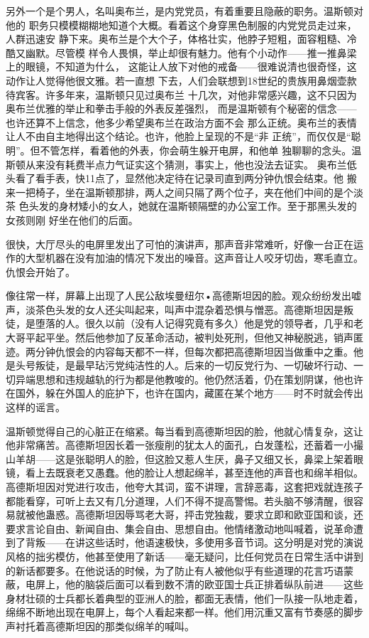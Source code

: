 另外一个是个男人，名叫奥布兰，是内党党员，有着重要且隐蔽的职务。温斯顿对他的
职务只模模糊糊地知道个大概。看着这个身穿黑色制服的内党党员走过来，人群迅速安
静下来。奥布兰是个大个子，体格壮实，他脖子短粗，面容粗糙、冷酷又幽默。尽管模
样令人畏惧，举止却很有魅力。他有个小动作——推一推鼻梁上的眼镜，不知道为什么，
这能让人放下对他的戒备——很难说清也很奇怪，这动作让人觉得他很文雅。若一直想
下去，人们会联想到18世纪的贵族用鼻烟壶款待宾客。许多年来，温斯顿只见过奥布兰
十几次，对他非常感兴趣，这不只因为奥布兰优雅的举止和拳击手般的外表反差强烈，
而是温斯顿有个秘密的信念——也许还算不上信念，他多少希望奥布兰在政治方面不会
那么正统。奥布兰的表情让人不由自主地得出这个结论。也许，他脸上呈现的不是``非
正统''，而仅仅是``聪明''。但不管怎样，看着他的外表，你会萌生躲开电屏，和他单
独聊聊的念头。温斯顿从来没有耗费半点力气证实这个猜测，事实上，他也没法去证实。
奥布兰低头看了看手表，快11点了，显然他决定待在记录司直到两分钟仇恨会结束。他
搬来一把椅子，坐在温斯顿那排，两人之间只隔了两个位子，夹在他们中间的是个淡茶
色头发的身材矮小的女人，她就在温斯顿隔壁的办公室工作。至于那黑头发的女孩则刚
好坐在他们的后面。

很快，大厅尽头的电屏里发出了可怕的演讲声，那声音非常难听，好像一台正在运作的大型机器在没有加油的情况下发出的噪音。这声音让人咬牙切齿，寒毛直立。仇恨会开始了。

像往常一样，屏幕上出现了人民公敌埃曼纽尔•高德斯坦因的脸。观众纷纷发出嘘声，淡茶色头发的女人还尖叫起来，叫声中混杂着恐惧与憎恶。高德斯坦因是叛徒，是堕落的人。很久以前（没有人记得究竟有多久）他是党的领导者，几乎和老大哥平起平坐。然后他参加了反革命活动，被判处死刑，但他又神秘脱逃，销声匿迹。两分钟仇恨会的内容每天都不一样，但每次都把高德斯坦因当做重中之重。他是头号叛徒，是最早玷污党纯洁性的人。后来的一切反党行为、一切破坏行动、一切异端思想和违规越轨的行为都是他教唆的。他仍然活着，仍在策划阴谋，他也许在国外，躲在外国人的庇护下，也许在国内，藏匿在某个地方——时不时就会传出这样的谣言。

温斯顿觉得自己的心脏正在缩紧。每当看到高德斯坦因的脸，他就心情复杂，这让他非常痛苦。高德斯坦因长着一张瘦削的犹太人的面孔，白发蓬松，还蓄着一小撮山羊胡——这是张聪明人的脸，但这脸又惹人生厌，鼻子又细又长，鼻梁上架着眼镜，看上去既衰老又愚蠢。他的脸让人想起绵羊，甚至连他的声音也和绵羊相似。高德斯坦因对党进行攻击，他夸大其词，蛮不讲理，言辞恶毒，这套把戏就连孩子都能看穿，可听上去又有几分道理，人们不得不提高警惕。若头脑不够清醒，很容易就被他蛊惑。高德斯坦因辱骂老大哥，抨击党独裁，要求立即和欧亚国和谈，还要求言论自由、新闻自由、集会自由、思想自由。他情绪激动地叫喊着，说革命遭到了背叛——在讲这些话时，他语速极快，多使用多音节词。这分明是对党的演说风格的拙劣模仿，他甚至使用了新话——毫无疑问，比任何党员在日常生活中讲到的新话都要多。在他说话的时候，为了防止有人被他似乎有些道理的花言巧语蒙蔽，电屏上，他的脑袋后面可以看到数不清的欧亚国士兵正排着纵队前进——这些身材壮硕的士兵都长着典型的亚洲人的脸，都面无表情，他们一队接一队地走着，绵绵不断地出现在电屏上，每个人看起来都一样。他们用沉重又富有节奏感的脚步声衬托着高德斯坦因的那类似绵羊的喊叫。

